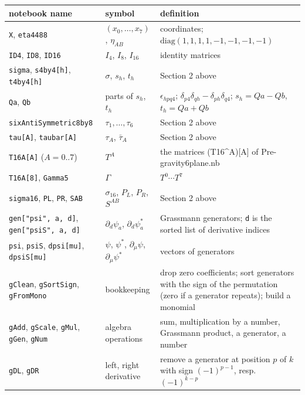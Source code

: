 \documentclass[10pt]{article}
\begin{document}
{\small\begin{longtable}{>{\raggedright\arraybackslash}p{}>{\raggedright\arraybackslash}p{}>{\raggedright\arraybackslash}p{}}\toprule
notebook name & symbol & definition \\\midrule\endhead
\bottomrule\endfoot
\texttt{X}, \texttt{eta4488} & $(x_0, \dots, x_7)$, $\eta_{AB}$ & coordinates; $\mathrm{diag}(1,1,1,1,-1,-1,-1,-1)$ \\
\texttt{ID4}, \texttt{ID8}, \texttt{ID16} & $I_4$, $I_8$, $I_{16}$ & identity matrices \\
\texttt{sigma}, \texttt{s4by4[h]}, \texttt{t4by4[h]} & $\sigma$, $s_h$, $t_h$ & Section 2 above \\
\texttt{Qa}, \texttt{Qb} & parts of $s_h$, $t_h$ & $\epsilon_{hpq4}$; $\delta_{p4}\delta_{qh} - \delta_{ph}\delta_{q4}$; $s_h = Qa - Qb$, $t_h = Qa + Qb$ \\
\texttt{sixAntiSymmetric8by8} & $\tau_1, \dots, \tau_6$ & Section 2 above \\
\texttt{tau[A]}, \texttt{taubar[A]} & $\tau_A$, $\bar\tau_A$ & Section 2 above \\
\texttt{T16A[A]} ($A = 0..7$) & $T^A$ & the matrices (T16\^{}A)[A] of Pre-gravity6plane.nb \\
\texttt{T16A[8]}, \texttt{Gamma5} & $\Gamma$ & $T^0\cdots T^7$ \\
\texttt{sigma16}, \texttt{PL}, \texttt{PR}, \texttt{SAB} & $\sigma_{16}$, $P_L$, $P_R$, $S^{AB}$ & Section 2 above \\
\texttt{gen["psi", a, d]}, \texttt{gen["psiS", a, d]} & $\partial_d\psi_a$, $\partial_d\psi_a^*$ & Grassmann generators; \texttt{d} is the sorted list of derivative indices \\
\texttt{psi}, \texttt{psiS}, \texttt{dpsi[mu]}, \texttt{dpsiS[mu]} & $\psi$, $\psi^*$, $\partial_\mu\psi$, $\partial_\mu\psi^*$ & vectors of generators \\
\texttt{gClean}, \texttt{gSortSign}, \texttt{gFromMono} & bookkeeping & drop zero coefficients; sort generators with the sign of the permutation (zero if a generator repeats); build a monomial \\
\texttt{gAdd}, \texttt{gScale}, \texttt{gMul}, \texttt{gGen}, \texttt{gNum} & algebra operations & sum, multiplication by a number, Grassmann product, a generator, a number \\
\texttt{gDL}, \texttt{gDR} & left, right derivative & remove a generator at position $p$ of $k$ with sign $(-1)^{p-1}$, resp. $(-1)^{k-p}$ \\

\end{longtable}}
\end{document}
